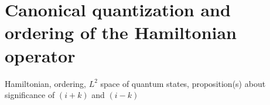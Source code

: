 \section{Canonical quantization and ordering of the Hamiltonian operator}
\label{canonical}

Hamiltonian, ordering, $L^2$ space of quantum states, proposition(s) about significance of $(i+k)$ and $(i-k)$

